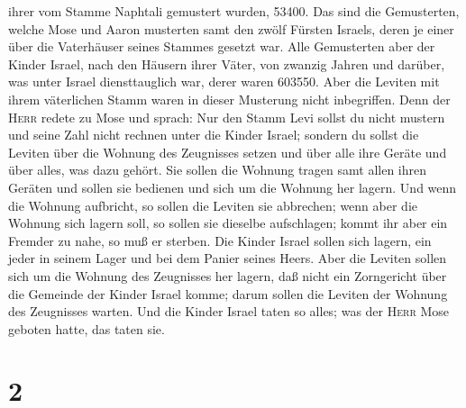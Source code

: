 ihrer vom Stamme Naphtali gemustert wurden, 53400.  Das
sind die Gemusterten, welche Mose und Aaron musterten samt den zwölf
Fürsten Israels, deren je einer über die Vaterhäuser seines Stammes
gesetzt war.  Alle Gemusterten aber der Kinder Israel,
nach den Häusern ihrer Väter, von zwanzig Jahren und darüber, was unter
Israel diensttauglich war, derer waren 603550.  Aber die
Leviten mit ihrem väterlichen Stamm  waren in dieser
Musterung nicht inbegriffen.  Denn der \textsc{Herr}
redete zu Mose und sprach:  Nur den Stamm Levi sollst du
nicht mustern und seine Zahl nicht rechnen unter die Kinder Israel;
 sondern du sollst die Leviten über die Wohnung des
Zeugnisses setzen und über alle ihre Geräte und über alles, was dazu
gehört. Sie sollen die Wohnung tragen samt allen ihren Geräten und
sollen sie bedienen und sich um die Wohnung her lagern. 
Und wenn die Wohnung aufbricht, so sollen die Leviten sie abbrechen;
wenn aber die Wohnung sich lagern soll, so sollen sie dieselbe
aufschlagen; kommt ihr aber ein Fremder zu nahe, so muß er sterben.
 Die Kinder Israel sollen sich lagern, ein jeder in
seinem Lager und bei dem Panier seines Heers.  Aber die
Leviten sollen sich um die Wohnung des Zeugnisses her lagern, daß nicht
ein Zorngericht über die Gemeinde der Kinder Israel komme; darum sollen
die Leviten der Wohnung des Zeugnisses warten.  Und die
Kinder Israel taten so alles; was der \textsc{Herr} Mose geboten hatte,
das taten sie.

\hypertarget{section-1}{%
\section{2}\label{section-1}}

